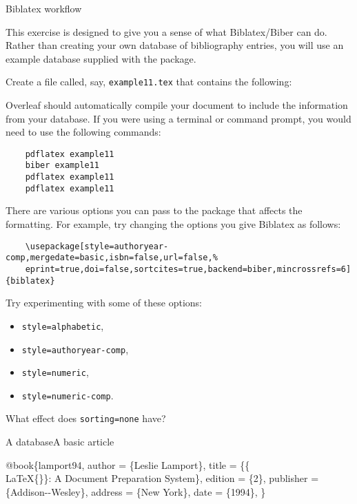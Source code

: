 \begin{frame}{Biblatex workflow}
\end{frame}

\begin{exercise}\label{ex:biblatex-example}
  This exercise is designed to give you a sense of what Biblatex/Biber can do.
  Rather than creating your own database of bibliography entries, you will use an example database supplied with the  package.

  Create a file called, say, \texttt{example11.tex} that contains the following: 

  Overleaf should automatically compile your document to include the information from your database.
  If you were using a terminal or command prompt, you would need to use the following commands:
  \begin{verbatim}
    pdflatex example11
    biber example11
    pdflatex example11
    pdflatex example11
  \end{verbatim}

  There are various options you can pass to the  package that affects the formatting.
  For example, try changing the options you give Biblatex as follows:
  \begin{verbatim}
    \usepackage[style=authoryear-comp,mergedate=basic,isbn=false,url=false,%
    eprint=true,doi=false,sortcites=true,backend=biber,mincrossrefs=6]{biblatex}
  \end{verbatim}
  Try experimenting with some of these options:
  \begin{itemize}
    \item \texttt{style=alphabetic},
    \item \texttt{style=authoryear-comp},
    \item \texttt{style=numeric},
    \item \texttt{style=numeric-comp}.
  \end{itemize}
  What effect does \texttt{sorting=none} have?
\end{exercise}

\begin{frame}[fragile]{A \BibTeX{} database}{A basic article}

\begin{example}
  \begin{semiverbatim}
  \alert<2>{@book}\alert<3>{\{}\alert<4>{lamport94}\alert<5>{,}
    \alert<6>{author}    \alert<7>{= \{}\alert<8>{Leslie Lamport}\alert<7>{\},}
    \alert<6>{title}     \alert<7>{=
    \{}\alert<8-9>{\{\\LaTeX\{\}\}}\alert<8>{: A Document Preparation System}\alert<7>{\},}
    \alert<6>{edition}   \alert<7>{= \{}\alert<8>{2}\alert<7>{\},}
    \alert<6>{publisher} \alert<7>{= \{}\alert<8>{Addison-{}-Wesley}\alert<7>{\},}
    \alert<6>{address}   \alert<7>{= \{}\alert<8>{New York}\alert<7>{\},}
    \alert<6>{date}      \alert<7>{= \{}\alert<8,10>{{1994}}\alert<7>{\},}
  \alert<3>{\}}
  \end{semiverbatim}
\end{example}

\end{frame}

